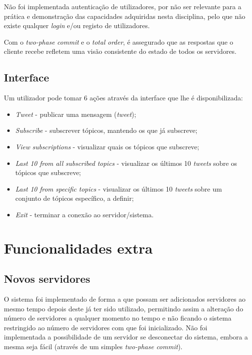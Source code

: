 \documentclass[a4paper]{report}
\begin{document}
		Não foi implementada autenticação de utilizadores, por não ser relevante para a prática e demonstração das capacidades adquiridas nesta disciplina, pelo que não existe qualquer \textit{login} e/ou registo de utilizadores.

		Com o \textit{two-phase commit} e o \textit{total order}, é assegurado que as respostas que o cliente recebe refletem uma visão consistente do estado de todos os servidores.

		\subsection{Interface}
		Um utilizador pode tomar 6 ações através da interface que lhe é disponibilizada:
		\begin{itemize}
			\item \textit{Tweet} - publicar uma mensagem (\textit{tweet});
			\item \textit{Subscribe} - subscrever tópicos, mantendo os que já subscreve;
			\item \textit{View subscriptions} - visualizar quais os tópicos que subscreve;
			\item \textit{Last 10 from all subscribed topics} - visualizar os últimos 10 \textit{tweets} sobre os tópicos que subscreve;
			\item \textit{Last 10 from specific topics} - visualizar os últimos 10 \textit{tweets} sobre um conjunto de tópicos específico, a definir;
			\item \textit{Exit} - terminar a conexão ao servidor/sistema.
		\end{itemize}

	\section{Funcionalidades extra}
		\subsection{Novos servidores}

		O sistema foi implementado de forma a que possam ser adicionados servidores ao mesmo tempo depois deste já ter sido utilizado, 
		permitindo assim a alteração do número de servidores a qualquer momento no tempo e não ficando o sistema restringido ao número de servidores com que foi inicializado.
		Não foi implementada a possibilidade de um servidor se desconectar do sistema, embora a mesma seja fácil (através de um simples \textit{two-phase commit}).
\end{document}
